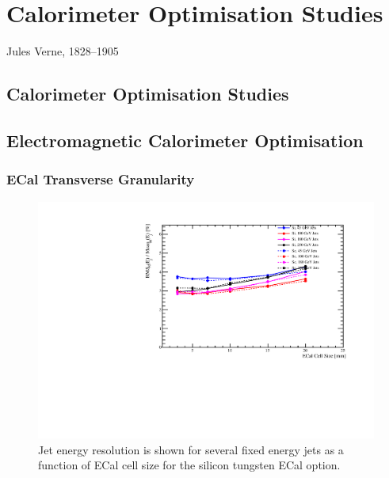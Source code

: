 \chapter{Calorimeter Optimisation Studies}
\label{chap:MoreStuff}

{Jules Verne, 1828--1905}

\section{Calorimeter Optimisation Studies}



\section{Electromagnetic Calorimeter Optimisation}
\label{optstud:sec:ecal}

\subsection{ECal Transverse Granularity}
\label{optstud:sec:ecal:cellsize}

\begin{figure}
  \includegraphics[width=\largefigwidth]{OptimisationStudies/Plots/JER_vs_SiliconECalCellSize.pdf}
  \caption[Jet energy resolution as a function of ECal cell size for the silicon tungsten ECal option.]{Jet energy resolution is shown for several fixed energy jets as a function of ECal cell size for the silicon tungsten ECal option.}
  \label{optstud:fig:siecalcells}
\end{figure}

